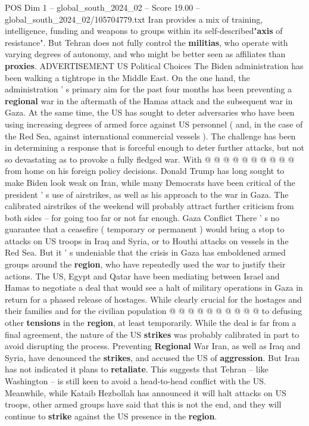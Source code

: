 \begin{textsample}{POS Dim 1 – global\_south\_2024\_02 – Score 19.00 – global\_south\_2024\_02/105704779.txt}
Iran provides a mix of training, intelligence, funding and weapons to groups within its self-described"\textbf{axis} of resistance".
But Tehran does not fully control the \textbf{militias}, who operate with varying degrees of autonomy, and who might be better seen as affiliates than \textbf{proxies}.
ADVERTISEMENT US Political Choices The Biden administration has been walking a tightrope in the Middle East.
On the one hand, the administration ' s primary aim for the past four months has been preventing a \textbf{regional} war in the aftermath of the Hamas attack and the subsequent war in Gaza.
At the same time, the US has sought to deter adversaries who have been using increasing degrees of armed force against US personnel ( and, in the case of the Red Sea, against international commercial vessels ).
The challenge has been in determining a response that is forceful enough to deter further attacks, but not so devastating as to provoke a fully fledged war.
With @ @ @ @ @ @ @ @ @ @ from home on his foreign policy decisions.
Donald Trump has long sought to make Biden look weak on Iran, while many Democrats have been critical of the president ' s use of airstrikes, as well as his approach to the war in Gaza.
The calibrated airstrikes of the weekend will probably attract further criticism from both sides -- for going too far or not far enough.
Gaza Conflict There ' s no guarantee that a ceasefire ( temporary or permanent ) would bring a stop to attacks on US troops in Iraq and Syria, or to Houthi attacks on vessels in the Red Sea.
But it ' s undeniable that the crisis in Gaza has emboldened armed groups around the \textbf{region}, who have repeatedly used the war to justify their actions.
The US, Egypt and Qatar have been mediating between Israel and Hamas to negotiate a deal that would see a halt of military operations in Gaza in return for a phased release of hostages.
While clearly crucial for the hostages and their families and for the civilian population @ @ @ @ @ @ @ @ @ @ to defusing other \textbf{tensions} in the \textbf{region}, at least temporarily.
While the deal is far from a final agreement, the nature of the US \textbf{strikes} was probably calibrated in part to avoid disrupting the process.
Preventing \textbf{Regional} War Iran, as well as Iraq and Syria, have denounced the \textbf{strikes}, and accused the US of \textbf{aggression}.
But Iran has not indicated it plans to \textbf{retaliate}.
This suggests that Tehran -- like Washington -- is still keen to avoid a head-to-head conflict with the US.
Meanwhile, while Kataib Hezbollah has announced it will halt attacks on US troops, other armed groups have said that this is not the end, and they will continue to \textbf{strike} against the US presence in the \textbf{region}.

\end{textsample}
